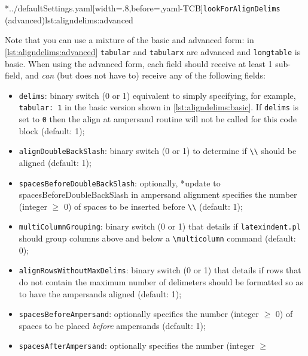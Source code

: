 	\cmhlistingsfromfile[style=lookForAlignDelims]*{../defaultSettings.yaml}[width=.8\linewidth,before=\centering,yaml-TCB]{\texttt{lookForAlignDelims} (advanced)}{lst:aligndelims:advanced}

	Note that you can use a mixture of the basic and advanced form: in
	\cref{lst:aligndelims:advanced} \texttt{tabular} and \texttt{tabularx} are advanced and
	\texttt{longtable} is basic. When using the advanced form, each field should receive at
	least 1 sub-field, and \emph{can} (but does not have to) receive any of the following
	fields:
	\begin{itemize}
		\item \texttt{delims}: binary switch (0 or 1) equivalent to simply specifying, for
		      example, \texttt{tabular: 1} in the basic version shown in \cref{lst:aligndelims:basic}.
		      If \texttt{delims} is set to \texttt{0} then the align at ampersand routine will not be
		      called for this code block (default: 1);
		\item \texttt{alignDoubleBackSlash}: binary switch (0 or 1) to determine if
		      \lstinline!\\!
		      should be aligned (default: 1);
		\item \texttt{spacesBeforeDoubleBackSlash}: optionally,%
		      *{update to spacesBeforeDoubleBackSlash in ampersand alignment}
		      specifies the number (integer $\geq$ 0) of spaces to be inserted before
		      \lstinline!\\! (default: 1); %
		\item {} \texttt{multiColumnGrouping}: binary switch (0
		      or 1) that details if \texttt{latexindent.pl} should group columns above and below a
		      \lstinline!\multicolumn! command (default: 0);
		\item {} \texttt{alignRowsWithoutMaxDelims}:
		      binary switch (0 or 1) that details if rows that do not contain the maximum number of
		      delimeters should be formatted so as to have the ampersands aligned (default: 1);
		\item {}\texttt{spacesBeforeAmpersand}: optionally specifies the number (integer $\geq$
		      0) of spaces to be placed \emph{before} ampersands (default: 1);
		\item {}\texttt{spacesAfterAmpersand}: optionally specifies the number (integer $\geq$

\end{itemize}
